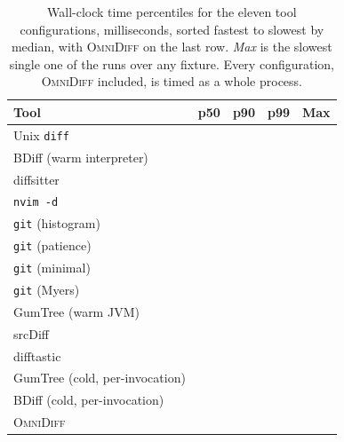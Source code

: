 \documentclass[sigconf,review]{acmart}
\begin{document}
\begin{table}
  \caption{Wall-clock time percentiles for the eleven tool configurations, milliseconds, sorted
  fastest to slowest by median, with \textsc{OmniDiff} on the last row. \emph{Max} is the slowest
  single one of the \TimingRepeats{} runs over any fixture. Every configuration, \textsc{OmniDiff}
  included, is timed as a whole process.}
  \label{tab:speed-vs-others}
  \small
  \begin{tabular}{lrrrr}
    \toprule
    Tool & p50 & p90 & p99 & Max \\
    \midrule
    Unix \texttt{diff} & \SpeedUnixDiffPFifty{} & \SpeedUnixDiffPNinety{} & \SpeedUnixDiffPNinetyNine{} & \SpeedUnixDiffMax{} \\
    BDiff (warm interpreter) & \SpeedBDiffWarmPFifty{} & \SpeedBDiffWarmPNinety{} & \SpeedBDiffWarmPNinetyNine{} & \SpeedBDiffWarmMax{} \\
    diffsitter & \SpeedDiffsitterPFifty{} & \SpeedDiffsitterPNinety{} & \SpeedDiffsitterPNinetyNine{} & \SpeedDiffsitterMax{} \\
    \texttt{nvim -d} & \SpeedNvimDiffPFifty{} & \SpeedNvimDiffPNinety{} & \SpeedNvimDiffPNinetyNine{} & \SpeedNvimDiffMax{} \\
    \texttt{git} (histogram) & \SpeedGitHistogramPFifty{} & \SpeedGitHistogramPNinety{} & \SpeedGitHistogramPNinetyNine{} & \SpeedGitHistogramMax{} \\
    \texttt{git} (patience) & \SpeedGitPatiencePFifty{} & \SpeedGitPatiencePNinety{} & \SpeedGitPatiencePNinetyNine{} & \SpeedGitPatienceMax{} \\
    \texttt{git} (minimal) & \SpeedGitMinimalPFifty{} & \SpeedGitMinimalPNinety{} & \SpeedGitMinimalPNinetyNine{} & \SpeedGitMinimalMax{} \\
    \texttt{git} (Myers) & \SpeedGitMyersPFifty{} & \SpeedGitMyersPNinety{} & \SpeedGitMyersPNinetyNine{} & \SpeedGitMyersMax{} \\
    GumTree (warm JVM) & \SpeedGumTreeWarmPFifty{} & \SpeedGumTreeWarmPNinety{} & \SpeedGumTreeWarmPNinetyNine{} & \SpeedGumTreeWarmMax{} \\
    srcDiff & \SpeedSrcDiffPFifty{} & \SpeedSrcDiffPNinety{} & \SpeedSrcDiffPNinetyNine{} & \SpeedSrcDiffMax{} \\
    difftastic & \SpeedDifftasticPFifty{} & \SpeedDifftasticPNinety{} & \SpeedDifftasticPNinetyNine{} & \SpeedDifftasticMax{} \\
    GumTree (cold, per-invocation) & \SpeedGumTreeColdPFifty{} & \SpeedGumTreeColdPNinety{} & \SpeedGumTreeColdPNinetyNine{} & \SpeedGumTreeColdMax{} \\
    BDiff (cold, per-invocation) & \SpeedBDiffColdPFifty{} & \SpeedBDiffColdPNinety{} & \SpeedBDiffColdPNinetyNine{} & \SpeedBDiffColdMax{} \\
    \midrule
    \textsc{OmniDiff} & \SpeedOmniDiffPFifty{} & \SpeedOmniDiffPNinety{} & \SpeedOmniDiffPNinetyNine{} & \SpeedOmniDiffMax{} \\
    \bottomrule
  \end{tabular}
\end{table}
\end{document}
